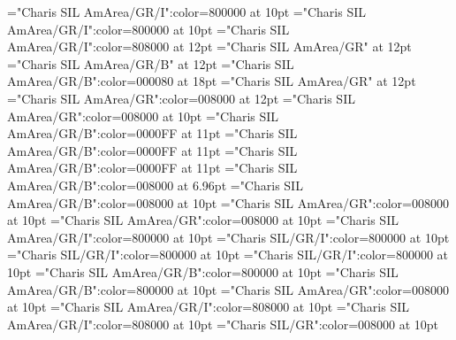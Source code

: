 \documentclass[a4paper,twoside]{article}
\begin{document}
\font\spanmxbheadwordconfigtargetconfigtargetslexsensereferencelexsensereferencesmainentrysubsenses="Charis SIL AmArea/GR/I":color=800000 at 10pt
\font\spanheadwordconfigtargetconfigtargetslexsensereferencelexsensereferencesmainentrysubsenses="Charis SIL AmArea/GR/I":color=800000 at 10pt
\font\translationstes="Charis SIL AmArea/GR/I":color=808000 at 12pt
\font\spanheadwordconfigtargetconfigtargets="Charis SIL AmArea/GR" at 12pt
\font{}="Charis SIL AmArea/GR/B" at 12pt
\font{}="Charis SIL AmArea/GR/B":color=000080 at 18pt
\font{}="Charis SIL AmArea/GR" at 12pt
\font\entryletDatadicBody="Charis SIL AmArea/GR":color=008000 at 12pt
\font\spanentryletDatadicBody="Charis SIL AmArea/GR":color=008000 at 10pt
\font\spanmxbspanentryletDatadicBody="Charis SIL AmArea/GR/B":color=0000FF at 11pt
\font\aspanmxbspanentryletDatadicBody="Charis SIL AmArea/GR/B":color=0000FF at 11pt
\font\spanmainheadwordentryspanentryletDatadicBody="Charis SIL AmArea/GR/B":color=0000FF at 11pt
\font\homographnumberentryentryletDatadicBody="Charis SIL AmArea/GR/B":color=008000 at 6.96pt
\font\spanhomographnumberentryentryletDatadicBody="Charis SIL AmArea/GR/B":color=008000 at 10pt
\font\spanspanentryletDatadicBody="Charis SIL AmArea/GR":color=008000 at 10pt
\font\spanspanspanentryletDatadicBody="Charis SIL AmArea/GR":color=008000 at 10pt
\font\partofspeechspanspanspanentryletDatadicBody="Charis SIL AmArea/GR/I":color=800000 at 10pt
\font\spanespartofspeechspanspanspanentryletDatadicBody="Charis SIL/GR/I":color=800000 at 10pt
\font\spanpartofspeechmorphosyntaxanalysissharedgrammaticalinfosensesentryspanespartofspeechspanspanspanentryletDatadicBody="Charis SIL/GR/I":color=800000 at 10pt
\font\spanpartofspeechmorphosyntaxanalysissharedgrammaticalinfosensesentrypartofspeechspanspanspanentryletDatadicBody="Charis SIL/GR/I":color=800000 at 10pt
\font\sensenumbersensecontentsensessensesensecontentsensesmainentrycomplexspanspanentryletDatadicBody="Charis SIL AmArea/GR/B":color=800000 at 10pt
\font\spansensenumbersensecontentsensessensesensecontentsensesmainentrycomplexspanspanentryletDatadicBody="Charis SIL AmArea/GR/B":color=800000 at 10pt
\font\sensespanspanentryletDatadicBody="Charis SIL AmArea/GR":color=008000 at 10pt
\font{}="Charis SIL AmArea/GR/I":color=808000 at 10pt
\font{}="Charis SIL AmArea/GR/I":color=808000 at 10pt
\font{}="Charis SIL/GR":color=008000 at 10pt
\end{document}
